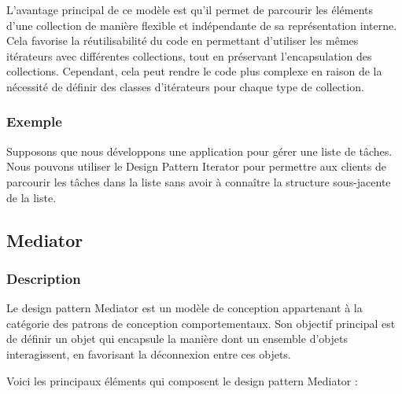 \documentclass[french]{article}
\begin{document}
L'avantage principal de ce modèle est qu'il permet de parcourir les éléments d'une collection de manière flexible et indépendante de sa représentation interne. Cela favorise la réutilisabilité du code en permettant d'utiliser les mêmes itérateurs avec différentes collections, tout en préservant l'encapsulation des collections. Cependant, cela peut rendre le code plus complexe en raison de la nécessité de définir des classes d'itérateurs pour chaque type de collection.


\subsubsection{Exemple}

Supposons que nous développons une application pour gérer une liste de tâches. Nous pouvons utiliser le Design Pattern Iterator pour permettre aux clients de parcourir les tâches dans la liste sans avoir à connaître la structure sous-jacente de la liste.




\newpage

\subsection{Mediator}

\subsubsection{Description}

Le design pattern Mediator est un modèle de conception appartenant à la catégorie des patrons de conception comportementaux. Son objectif principal est de définir un objet qui encapsule la manière dont un ensemble d'objets interagissent, en favorisant la déconnexion entre ces objets.

Voici les principaux éléments qui composent le design pattern Mediator :
\end{document}
